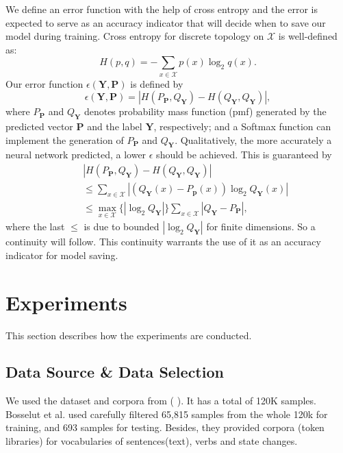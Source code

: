 \documentclass[letterpaper]{article}
\newcommand{\citealp}[1]{\citeauthor{#1} \citeyear{#1}}
\begin{document}
We define an error function with the help of cross entropy and the error is
expected to serve as an accuracy indicator that will decide when to save our model during training. Cross entropy for discrete topology on $\mathcal{X}$ is well-defined as:
\begin{equation}
H(p,q)=-\sum_{x\in\mathcal{X}} p(x)\log_2 q(x).
\end{equation}
Our error function $\epsilon(\mathbf{Y},\mathbf{P})$ is defined by
\begin{equation}
\epsilon(\mathbf{Y},\mathbf{P})=|H(P_{\mathbf{P}},Q_{\mathbf{Y}} )-H(Q_{\mathbf{Y}}, Q_{\mathbf{Y}} )|,
\end{equation}
where $P_{\mathbf{P}}$ and $Q_{\mathbf{Y}}$ denotes probability mass function (pmf) generated by the predicted vector $\mathbf{P}$ and the label $\mathbf{Y}$, respectively; and a Softmax function can implement the generation of $P_{\mathbf{P}}$ and $Q_{\mathbf{Y}}$. Qualitatively, the more accurately a neural network predicted, a lower $\epsilon$ should  be achieved. This is guaranteed by
\begin{eqnarray}
&&	|H(P_\mathbf{P},Q_\mathbf{Y})-H(Q_\mathbf{Y},Q_\mathbf{Y})|  \nonumber \\
&&	\le \sum_{x \in \mathcal{X}} |(Q_{\mathbf{Y}}(x) - P_{\mathbf{p}}(x))\log_2 Q_{\mathbf{Y}}(x)|
\nonumber \\
&&	\le \max_{x \in \mathcal{X}} \{|\log_2 Q_{\mathbf{Y}}|\} \sum_{x \in \mathcal{X}} |Q_{\mathbf{Y}}-P_{\mathbf{P}}| \nonumber,
\end{eqnarray}
where the last $\le$ is due to bounded $|\log_2 Q_{\mathbf{Y}}|$ for finite dimensions. So a continuity will follow. This continuity warrants the use of it as an accuracy indicator for model saving.


\section*{Experiments}
This section describes how the experiments are conducted.

\subsection*{Data Source \& Data Selection}

We used the dataset and corpora from (\citealp{bosselut2017simulating}). It has a total of 120K samples. Bosselut et al. used carefully filtered 65,815 samples from the whole 120k for training, and 693 samples for testing. Besides, they provided corpora (token libraries) for vocabularies of sentences(text), verbs and state changes.
\end{document}
